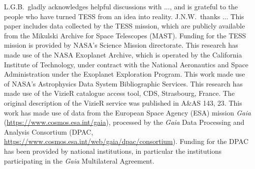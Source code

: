 \documentclass[12pt,twocolumn,tighten]{aastex62}
\begin{document}
\acknowledgements
L.G.B.\ gladly acknowledges helpful discussions with
..., and is
grateful to the people who have turned TESS from an idea into reality.
%
J.N.W.\ thanks ...
%
This paper includes data collected by the TESS mission, which are
publicly available from the Mikulski Archive for Space Telescopes
(MAST).
%
Funding for the TESS mission is provided by NASA's Science Mission
directorate.
%
This research has made use of the NASA Exoplanet Archive, which is
operated by the California Institute of Technology, under contract
with the National Aeronautics and Space Administration under the
Exoplanet Exploration Program.
%
This work made use of NASA's Astrophysics Data System Bibliographic
Services.
%
This research has made use of the VizieR catalogue access tool, CDS,
Strasbourg, France. The original description of the VizieR service was
published in A\&AS 143, 23.
%
This work has made use of data from the European Space Agency (ESA)
mission {\it Gaia} (\url{https://www.cosmos.esa.int/gaia}), processed
by the {\it Gaia} Data Processing and Analysis Consortium (DPAC,
\url{https://www.cosmos.esa.int/web/gaia/dpac/consortium}). Funding
for the DPAC has been provided by national institutions, in particular
the institutions participating in the {\it Gaia} Multilateral
Agreement.
%
\newline
%
%

                            
 

\end{document}
